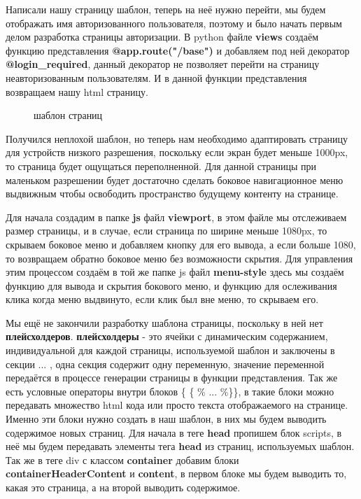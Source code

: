 \documentclass[12pt, oldlfont, amsfonts]{report}
\begin{document}
Написали нашу страницу шаблон, теперь на неё нужно перейти, мы будем отображать имя авторизованного пользователя, поэтому и было начать первым делом разработка страницы авторизации. В python файле {\bf views} создаём функцию представления {\bf @app.route("/base")} и добавляем под ней декоратор {\bf @login\_required}, данный декоратор не позволяет перейти на страницу неавторизованным пользователям. И в данной функции представления возвращаем нашу html страницу.

\begin{figure}[h!]
\caption{шаблон страниц}
\end{figure}

Получился неплохой шаблон, но теперь нам необходимо адаптировать страницу для устройств низкого разрешения, поскольку если экран будет меньше 1000px, то страница будет ощущаться переполненной. Для данной страницы при маленьком разрешении будет достаточно сделать боковое навигационное меню выдвижным чтобы освободить пространство будущему контенту на странице.

Для начала создадим в папке {\bf js} файл {\bf viewport}, в этом файле мы отслеживаем размер страницы, и в случае, если страница по ширине меньше 1080px, то скрываем боковое меню и добавляем кнопку для его вывода, а если больше 1080, то возвращаем обратно боковое меню без возможности скрытия. Для управления этим процессом создаём в той же папке js файл {\bf menu-style} здесь мы создаём функцию для вывода и скрытия бокового меню, и функцию для ослеживания клика когда меню выдвинуто, если клик был вне меню, то скрываем его.  

Мы ещё не закончили разработку шаблона страницы, поскольку в ней нет {\bf плейсхолдеров}. {\bf плейсхолдеры} - это ячейки с динамическим содержанием, индивидуальной для каждой страницы, используемой шаблон и заключены в секции {{... }}, одна секция содержит одну переменную, значение переменной передаётся в процессе генерации страницы в функции представления. Так же есть условные операторы внутри блоков \{ \{ \% ... \%\}\}, в такие блоки можно передавать множество html кода или просто текста отображаемого на странице. Именно эти блоки нужно создать в наш шаблон, в них мы будем выводить содержимое новых страниц. Для начала в теге {\bf head} пропишем блок {scripts}, в неё мы будем передавать элементы тега {\bf head} из страниц, используемых шаблон. Так же в теге div с классом {\bf container} добавим блоки {\bf containerHeaderContent} и {\bf content}, в первом блоке мы будем выводить то, какая это страница, а на второй выводить содержимое.
\end{document}

